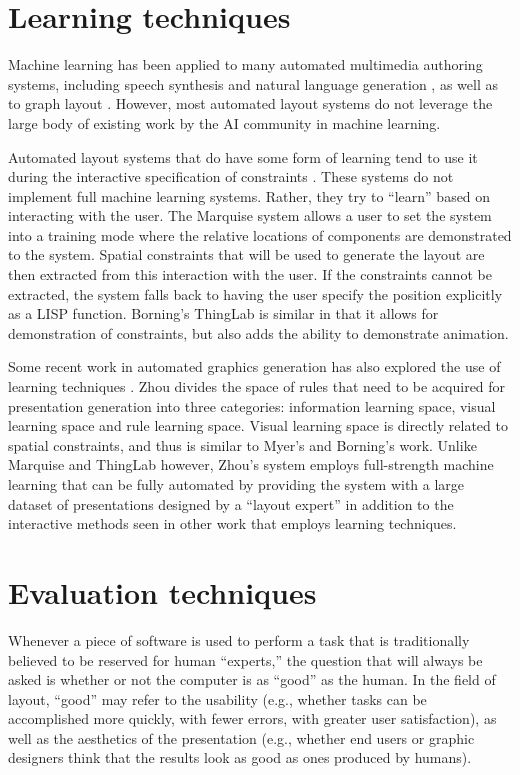     \section{Learning techniques}
    \label{learning-techniques}

    Machine learning has been applied to many automated multimedia authoring systems, including speech synthesis \citep{pan-1} and natural language generation \citep{kamimura-1}, as well as to graph layout \citep{masui-1}. However, most automated layout systems do not leverage the large body of existing work by the AI community in machine learning.

    Automated layout systems that do have some form of learning tend to use it during the interactive specification of constraints \citep{myers-1,borning-1}. These systems do not implement full machine learning systems. Rather, they try to “learn” based on interacting with the user. The Marquise system \citep{myers-1} allows a user to set the system into a training mode where the relative locations of components are demonstrated to the system. Spatial constraints that will be used to generate the layout are then extracted from this interaction with the user. If the constraints cannot be extracted, the system falls back to having the user specify the position explicitly as a LISP function. Borning’s \citep{borning-1} ThingLab is similar in that it allows for demonstration of constraints, but also adds the ability to demonstrate animation.

    Some recent work in automated graphics generation has also explored the use of learning techniques \citep{zhou-3}. Zhou divides the space of rules that need to be acquired for presentation generation into three categories: information learning space, visual learning space and rule learning space. Visual learning space is directly related to spatial constraints, and thus is similar to Myer’s and Borning’s work. Unlike Marquise and ThingLab however, Zhou’s system employs full-strength machine learning that can be fully automated by providing the system with a large dataset of presentations designed by a “layout expert” in addition to the interactive methods seen in other work that employs learning techniques.

    \section{Evaluation techniques}
    \label{evaluation-techniques}

    Whenever a piece of software is used to perform a task that is traditionally believed to be reserved for human “experts,” the question that will always be asked is whether or not the computer is as “good” as the human. In the field of layout, “good” may refer to the usability (e.g., whether tasks can be accomplished more quickly, with fewer errors, with greater user satisfaction), as well as the aesthetics of the presentation (e.g., whether end users or graphic designers think that the results look as good as ones produced by humans).

